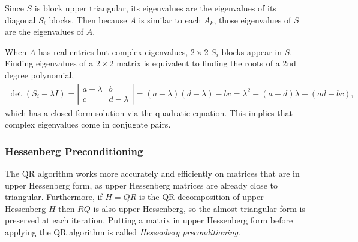Since $S$ is block upper triangular, its eigenvalues are the eigenvalues of its diagonal $S_i$ blocks.
Then because $A$ is similar to each $A_k$, those eigenvalues of $S$ are the eigenvalues of $A$.


When $A$ has real entries but complex eigenvalues, $2 \times 2$ $S_i$ blocks appear in $S$.
Finding eigenvalues of a $2 \times 2$ matrix is equivalent to finding the roots of a 2nd degree polynomial,
\begin{align}
\det(S_i - \lambda I) =
\left|\begin{array}{cc}
a - \lambda & b           \\
c           & d - \lambda
\end{array}\right|
= (a - \lambda)(d - \lambda) - bc
= \lambda^2 - (a+d)\lambda + (ad - bc),
\label{eq:qr-algorithm-roots}
\end{align}
which has a closed form solution via the quadratic equation.
This implies that complex eigenvalues come in conjugate pairs.

\subsubsection*{Hessenberg Preconditioning} %

The QR algorithm works more accurately and efficiently on matrices that are in upper Hessenberg form, as upper Hessenberg matrices are already close to triangular.
Furthermore, if $H = QR$ is the QR decomposition of upper Hessenberg $H$ then $RQ$ is also upper Hessenberg, so the almost-triangular form is preserved at each iteration.
Putting a matrix in upper Hessenberg form before applying the QR algorithm is called \emph{Hessenberg preconditioning}.


